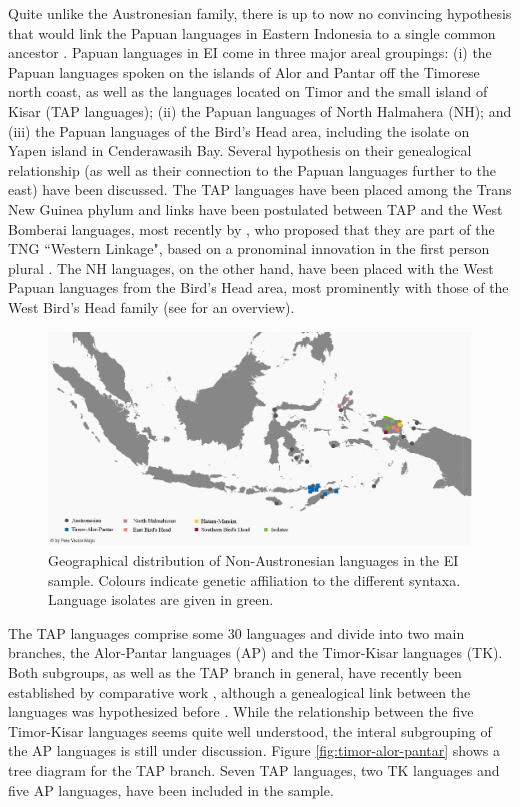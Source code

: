 Quite unlike the Austronesian family, there is up to now no convincing hypothesis that would link the Papuan languages in Eastern Indonesia to a single common ancestor \citep{reesink2005west, klamer2008east}. Papuan languages in EI come in three major areal groupings: (i) the Papuan languages spoken on the islands of Alor and Pantar off the Timorese north coast, as well as the languages located on Timor and the small island of Kisar (\acs{TAP} languages); (ii) the Papuan languages of North Halmahera (NH); and (iii) the Papuan languages of the Bird's Head area, including the isolate  on Yapen island in Cenderawasih Bay. Several hypothesis on their genealogical relationship (as well as their connection to the Papuan languages further to the east) have been discussed. The TAP languages have been placed among the Trans New Guinea phylum and links have been postulated between TAP and the West Bomberai languages, most recently by \citealt{Ross2005}, who proposed that they are part of the TNG ``Western Linkage", based on a pronominal innovation in the first person plural \citep[9]{schapper2014intro}. The NH languages, on the other hand, have been placed with the West Papuan languages from the Bird's Head area, most prominently with those of the West Bird's Head family (see \citealt{reesink2005west} for an overview).

\begin{figure}
\includegraphics[width=\columnwidth]{figures/Map_overview_klein_Papuaff.eps}
\caption[Geographical distribution of Non-Austronesian languages in the sample]{Geographical distribution of Non-Austronesian languages in the EI sample. Colours indicate genetic affiliation to the different syntaxa. Language isolates are given in green.}\label{map:Austro}
\end{figure}

The TAP languages comprise some 30 languages and divide into two main branches, the Alor-Pantar languages (\acs{AP}) and the Timor-Kisar languages (\acs{TK}). Both subgroups, as well as the TAP branch in general, have recently been established by comparative work \citep{holton2012historical, klamer2014alor}, although a genealogical link between the languages was hypothesized before \citep[7]{schapper2014intro}. While the relationship between the five Timor-Kisar languages seems quite well understood, the interal subgrouping of the AP languages is still under discussion. Figure \ref{fig:timor-alor-pantar} shows a tree diagram for the TAP branch. Seven TAP languages, two TK languages and five AP languages, have been included in the sample.

